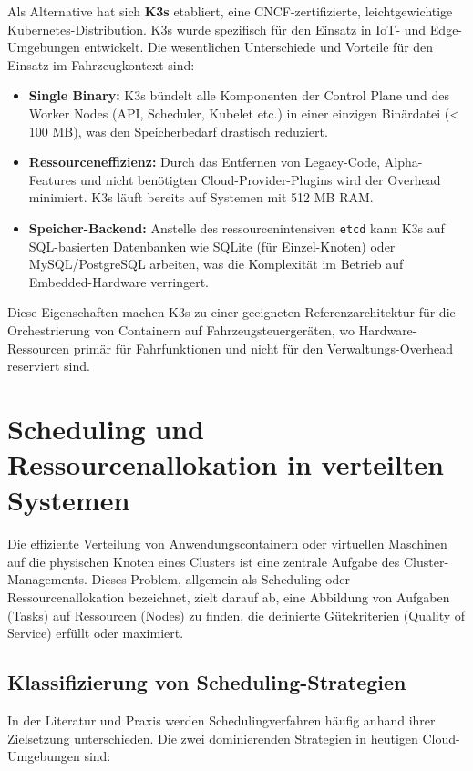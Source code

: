 Als Alternative hat sich \textbf{K3s} etabliert, eine CNCF-zertifizierte, leichtgewichtige Kubernetes-Distribution. K3s wurde spezifisch für den Einsatz in IoT- und Edge-Umgebungen entwickelt. Die wesentlichen Unterschiede und Vorteile für den Einsatz im Fahrzeugkontext sind:

\begin{itemize}
    \item \textbf{Single Binary:} K3s bündelt alle Komponenten der Control Plane und des Worker Nodes (API, Scheduler, Kubelet etc.) in einer einzigen Binärdatei (< 100 MB), was den Speicherbedarf drastisch reduziert.
    \item \textbf{Ressourceneffizienz:} Durch das Entfernen von Legacy-Code, Alpha-Features und nicht benötigten Cloud-Provider-Plugins wird der Overhead minimiert. K3s läuft bereits auf Systemen mit 512 MB RAM.
    \item \textbf{Speicher-Backend:} Anstelle des ressourcenintensiven \texttt{etcd} kann K3s auf SQL-basierten Datenbanken wie SQLite (für Einzel-Knoten) oder MySQL/PostgreSQL arbeiten, was die Komplexität im Betrieb auf Embedded-Hardware verringert.
\end{itemize} \cite{k3s2025}

Diese Eigenschaften machen K3s zu einer geeigneten Referenzarchitektur für die Orchestrierung von Containern auf Fahrzeugsteuergeräten, wo Hardware-Ressourcen primär für Fahrfunktionen und nicht für den Verwaltungs-Overhead reserviert sind.

\section{Scheduling und Ressourcenallokation in verteilten Systemen}
\label{sec:stand_der_technik_scheduling}

Die effiziente Verteilung von Anwendungscontainern oder virtuellen Maschinen auf die physischen Knoten eines Clusters ist eine zentrale Aufgabe des Cluster-Managements. Dieses Problem, allgemein als Scheduling oder Ressourcenallokation bezeichnet, zielt darauf ab, eine Abbildung von Aufgaben (Tasks) auf Ressourcen (Nodes) zu finden, die definierte Gütekriterien (Quality of Service) erfüllt oder maximiert. \cite{Schwarzkopf2013}

\subsection{Klassifizierung von Scheduling-Strategien}
In der Literatur und Praxis werden Schedulingverfahren häufig anhand ihrer Zielsetzung unterschieden. Die zwei dominierenden Strategien in heutigen Cloud-Umgebungen sind:

